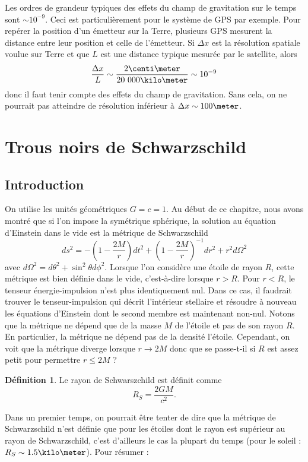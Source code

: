 \documentclass[a4paper,11pt]{report}
\theoremstyle{definition}
\theoremstyle{plain}
\theoremstyle{definition}
\newtheorem{defn}{Définition}[chapter]
\theoremstyle{remark}
\begin{document}
        Les ordres de grandeur typiques des effets du champ de gravitation sur le temps sont $\sim10^{-9}$. Ceci est particulièrement pour le système de GPS par exemple. Pour repérer la position d'un émetteur sur la Terre, plusieurs GPS mesurent la distance entre leur position et celle de l'émetteur. Si $\Delta x$ est la résolution spatiale voulue sur Terre et que $L$ est une distance typique mesurée par le satellite, alors
        \begin{equation}
            \frac{\Delta x}{L}\sim\frac{2\centi\meter}{20~000\kilo\meter}\sim10^{-9}
        \end{equation}
        donc il faut tenir compte des effets du champ de gravitation. Sans cela, on ne pourrait pas atteindre de résolution inférieur à $\Delta x\sim100\meter$.
        
    \section{Trous noirs de Schwarzschild}
    
        \subsection{Introduction}
    
            On utilise les unités géométriques $G = c = 1$. Au début de ce chapitre, nous avons montré que si l'on impose la symétrique sphérique, la solution au équation d'Einstein dans le vide est la métrique de Schwarzschild
            \begin{equation}
                ds^2 = -\left( 1-\frac{2M}{r} \right)dt^2 + \left( 1-\frac{2M}{r} \right)^{-1}dr^2 + r^2d\Omega^2
            \end{equation}
            avec $d\Omega^2 = d\theta^2+\sin^2\theta d\phi^2$. Lorsque l'on considère une étoile de rayon $R$, cette métrique est bien définie dans le vide, c'est-à-dire lorsque $r>R$. Pour $r<R$, le tenseur énergie-impulsion n'est plus identiquement nul. Dans ce cas, il faudrait trouver le tenseur-impulsion qui décrit l'intérieur stellaire et résoudre à nouveau les équations d'Einstein dont le second membre est maintenant non-nul. Notons que la métrique ne dépend que de la masse $M$ de l'étoile et pas de son rayon $R$. En particulier, la métrique ne dépend pas de la densité l'étoile. Cependant, on voit que la métrique diverge lorsque $r\to2M$ donc que se passe-t-il si $R$ est assez petit pour permettre $r\leq2M$ ? 
            \begin{defn}
                Le rayon de Schwarszchild est définit comme  
                \begin{equation}
                    R_S =\frac{2GM}{c^2}.
                \end{equation}
            \end{defn}
            Dans un premier temps, on pourrait être tenter de dire que la métrique de Schwarzschild n'est définie que pour les étoiles dont le rayon est supérieur au rayon de Schwarzschild, c'est d'ailleurs le cas la plupart du temps (pour le soleil : $R_S\sim 1.5\kilo\meter$). Pour résumer :
            
\end{document}
